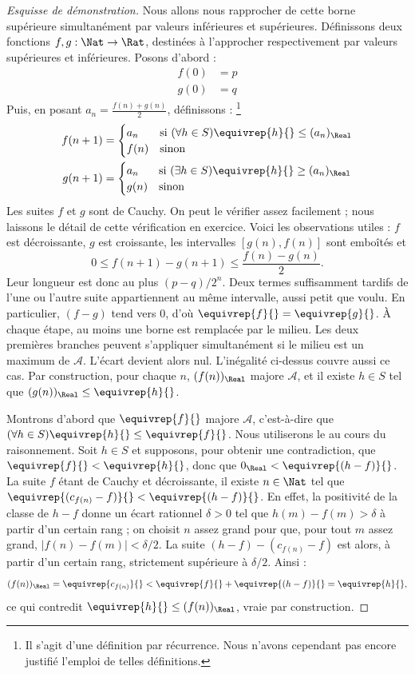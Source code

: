 \documentclass[../../../include/open-logic-section]{subfiles}
\begin{document}
\begin{proof}[Esquisse de démonstration]
Nous allons nous rapprocher de cette borne supérieure simultanément
par valeurs inférieures et supérieures. Définissons deux fonctions
$f,g:\Nat\to\Rat$, destinées à l'approcher respectivement par valeurs
supérieures et inférieures. Posons d'abord :
\begin{align*}
f(0)&=p\\
g(0)&=q
\end{align*}
Puis, en posant $a_n=\frac{f(n)+g(n)}2$, définissons :
\footnote{Il s'agit d'une définition par récurrence. Nous n'avons
cependant pas encore justifié l'emploi de telles définitions.}
\begin{align*}
f(n+1)&=\begin{cases}
a_n &\text{si }(\forall h\in S)\equivrep{h}{}\leq(a_n)_\Real\\
f(n)&\text{sinon}
\end{cases}\\
g(n+1)&=\begin{cases}
a_n &\text{si }(\exists h\in S)\equivrep{h}{}\geq(a_n)_\Real\\
g(n)&\text{sinon}
\end{cases}
\end{align*}
Les suites $f$ et $g$ sont de Cauchy. On peut le vérifier assez
facilement ; nous laissons le détail de cette vérification en exercice.
Voici les observations utiles : $f$ est décroissante, $g$ est
croissante, les intervalles $[g(n),f(n)]$ sont emboîtés et
\[
0\leq f(n+1)-g(n+1)\leq\frac{f(n)-g(n)}2.
\]
Leur longueur est donc au plus $(p-q)/2^n$. Deux termes suffisamment
tardifs de l'une ou l'autre suite appartiennent au même intervalle,
aussi petit que voulu. En particulier, $(f-g)$ tend vers $0$,
d'où $\equivrep{f}{}=\equivrep{g}{}$.
À chaque étape, au moins une borne est remplacée par le milieu.
Les deux premières branches peuvent s'appliquer simultanément si
le milieu est un maximum de $\mathcal A$. L'écart devient alors nul.
L'inégalité ci-dessus couvre aussi ce cas.
Par construction, pour
chaque $n$, $(f(n))_\Real$ majore $\mathcal A$, et il existe
$h\in S$ tel que $(g(n))_\Real\leq\equivrep{h}{}$.

Montrons d'abord que $\equivrep{f}{}$ majore $\mathcal A$,
c'est-à-dire que
$(\forall h\in S)\equivrep{h}{}\leq\equivrep{f}{}$.
Nous utiliserons le  au cours du raisonnement.
Soit $h\in S$ et supposons, pour obtenir une contradiction, que
$\equivrep{f}{}<\equivrep{h}{}$, donc que
$0_\Real<\equivrep{(h-f)}{}$. La suite $f$ étant de Cauchy et
décroissante, il existe $n\in\Nat$ tel que
$\equivrep{(c_{f(n)}-f)}{}<\equivrep{(h-f)}{}$.
En effet, la positivité de la classe de $h-f$ donne un écart rationnel
$\delta>0$ tel que $h(m)-f(m)>\delta$ à partir d'un certain rang ;
on choisit $n$ assez grand pour que, pour tout $m$ assez grand,
$|f(n)-f(m)|<\delta/2$. La suite
$(h-f)-(c_{f(n)}-f)$ est alors, à partir d'un certain rang,
strictement supérieure à $\delta/2$.
Ainsi :
\[
(f(n))_\Real=\equivrep{c_{f(n)}}{}
<\equivrep{f}{}+\equivrep{(h-f)}{}=\equivrep{h}{},
\]
ce qui contredit $\equivrep{h}{}\leq(f(n))_\Real$, vraie par construction.


\end{proof}
\end{document}

